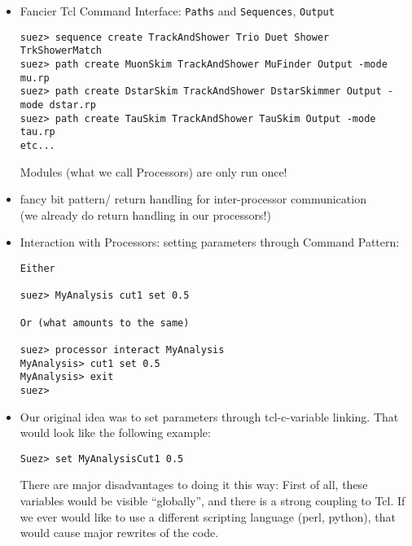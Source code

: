 \documentclass[12pt]{article}
\begin{document}
\begin{itemize}

  \item Fancier Tcl Command Interface: \texttt{Paths} and
  \texttt{Sequences}, \texttt{Output}
\begin{verbatim}
suez> sequence create TrackAndShower Trio Duet Shower TrkShowerMatch
suez> path create MuonSkim TrackAndShower MuFinder Output -mode mu.rp
suez> path create DstarSkim TrackAndShower DstarSkimmer Output -mode dstar.rp
suez> path create TauSkim TrackAndShower TauSkim Output -mode tau.rp
etc...
\end{verbatim}
%
Modules (what we call Processors) are only run once!

  \item fancy bit pattern/ return handling for inter-processor
	communication\\
	(we already do return handling in our processors!)

  \item Interaction with Processors: setting parameters through
        Command Pattern:
\begin{verbatim}
Either

suez> MyAnalysis cut1 set 0.5

Or (what amounts to the same)

suez> processor interact MyAnalysis
MyAnalysis> cut1 set 0.5
MyAnalysis> exit
suez>
\end{verbatim}

  \item Our original idea was to set parameters through tcl-c-variable
  linking. That would look like the following example:
%
\begin{verbatim}
Suez> set MyAnalysisCut1 0.5
\end{verbatim}
%
There are major disadvantages to doing it this way: 
First of all, these variables would be visible ``globally'', and there
is a strong coupling to Tcl. If we ever would like to use a different
scripting language (perl, python), that would cause major rewrites of
the code.

\end{itemize}
\end{document}
